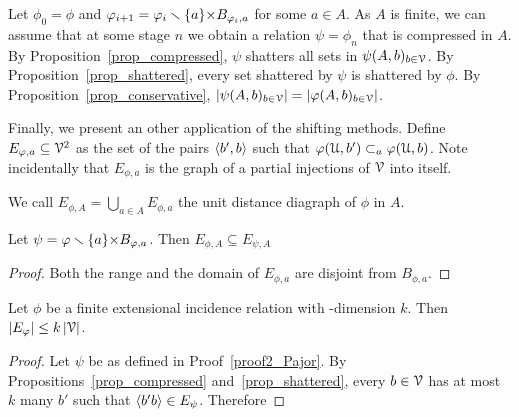 \documentclass[sputnik.tex]{subfiles}
\begin{document}
\begin{void_thm}\label{proof2_Pajor}\rm
Let $\phi_0=\phi$ and $\varphi_{i+1}=\varphi_i\smallsetminus \{a\}{\times}B_{\varphi_i,a}$ for some $a\in A$.
As $A$ is finite, we can assume that at some stage $n$ we obtain a relation $\psi=\phi_n$ that is compressed in $A$.
By Proposition~\ref{prop_compressed}, $\psi$ shatters all sets in $\psi(A,b)_{b\in\EuScript V}$.
By Proposition~\ref{prop_shattered}, every set shattered by $\psi$ is shattered by $\phi$.
By Proposition~\ref{prop_conservative}, $|\psi(A,b)_{b\in\EuScript V}|=|\varphi(A,b)_{b\in\EuScript V}|$.\QED
\end{void_thm}

Finally, we present an other application of the shifting methods. Define $E_{\varphi,a}\subseteq\EuScript V^2$ as the set of the pairs $\langle b',b\rangle$ such that $\varphi(\EuScript U,b')\subset_a\varphi(\EuScript U,b)$. 
Note incidentally that $E_{\phi,a}$ is the graph of a partial injections of $\EuScript V$ into itself. 

We call $\displaystyle E_{\phi,A}=\bigcup_{a\in A}E_{\phi,a}$ the unit distance diagraph of $\phi$ in $A$. 

\begin{proposition}\label{prop_udd1} 
Let $\psi=\varphi\smallsetminus\{a\}{\times}B_{\varphi,a}$. Then $E_{\phi,A}\subseteq E_{\psi,A}$
\end{proposition}
\begin{proof}Both the range and the domain of $E_{\phi,a}$ are disjoint from $B_{\phi,a}$.
\end{proof}

\begin{proposition}
Let $\phi$ be a finite extensional incidence relation with \vc-dimension $k$.
Then $|E_\varphi|\le k\,|\EuScript V|$.
\end{proposition}

\begin{proof}
Let $\psi$ be as defined in Proof~\ref{proof2_Pajor}.
By Propositions~\ref{prop_compressed} and~\ref{prop_shattered}, every $b\in\EuScript V$ has at most $k$ many $b'$ such that $\langle b'b\rangle\in E_\psi$.
Therefore

\end{proof}
\end{document}
